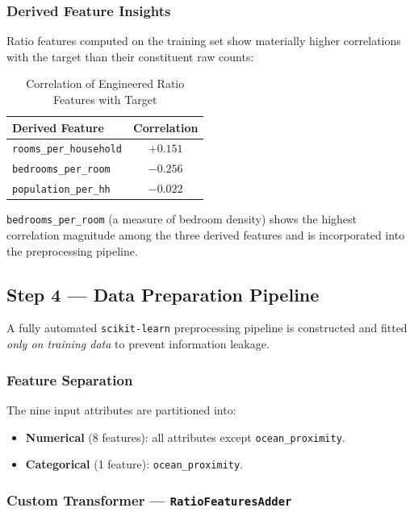 \documentclass[conference]{IEEEtran}
\begin{document}
\subsubsection{Derived Feature Insights}

Ratio features computed on the training set show materially higher correlations with the target than their constituent raw counts:

\begin{table}[H]
\centering
\caption{Correlation of Engineered Ratio Features with Target}
\label{tab:derived}
\begin{tabular}{@{}lc@{}}
\toprule
\textbf{Derived Feature} & \textbf{Correlation} \\
\midrule
\texttt{rooms\_per\_household}  & $+0.151$ \\
\texttt{bedrooms\_per\_room}    & $-0.256$ \\
\texttt{population\_per\_hh}    & $-0.022$ \\
\bottomrule
\end{tabular}
\end{table}

\texttt{bedrooms\_per\_room} (a measure of bedroom density) shows the highest correlation magnitude among the three derived features and is incorporated into the preprocessing pipeline.

\subsection{Step 4 — Data Preparation Pipeline}
\label{subsec:pipeline}

A fully automated \texttt{scikit-learn} preprocessing pipeline is constructed and fitted \emph{only on training data} to prevent information leakage.

\subsubsection{Feature Separation}
The nine input attributes are partitioned into:
\begin{itemize}
    \item \textbf{Numerical} (8 features): all attributes except \texttt{ocean\_proximity}.
    \item \textbf{Categorical} (1 feature): \texttt{ocean\_proximity}.
\end{itemize}

\subsubsection{Custom Transformer — \texttt{RatioFeaturesAdder}}
\end{document}
